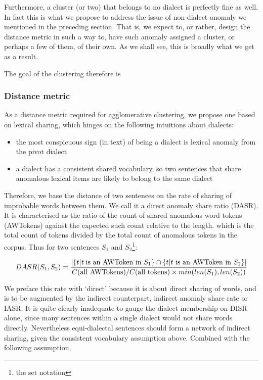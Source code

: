 \documentclass{article}
\begin{document}
Furthermore, a cluster (or two) that belongs to no dialect is perfectly fine as well. In fact this is what we propose to address the issue of non-dialect anomaly we mentioned in the preceding section. That is, we expect to, or rather, design the distance metric in such a way to, have such anomaly assigned a cluster, or perhaps a few of them, of their own. As we shall see, this is broadly what we get as a result. 

The goal of the clustering therefore is 

\subsubsection{Distance metric}

As a distance metric required for agglomerative clustering, we propose one based on lexical sharing, which hinges on the following intuitions about dialects:

\begin{itemize}
\item{the most conspicuous sign (in text) of being a dialect is lexical anomaly from the pivot dialect  }
\item{a dialect has a consistent shared vocabulary, so two sentences that share anomalous lexical items are likely to belong to the same dialect}
\end{itemize}

Therefore, we base the distance of two sentences on the rate of sharing of improbable words between them. We call it a direct anomaly share ratio (DASR). It is characterised as the ratio of the count of shared anomalous word tokens (AWTokens) against the expected such count relative to the length.  which is the total count of tokens divided by the total count of anomalous tokens in the corpus. Thus for two sentences $S_1$ and $S_2$\footnote{the set notation}:

\begin{equation}
  \label{eq:1}
DASR(S_1,S_2)= \frac{|\{t|\text{{\it t} is an AWToken in } S_1\}\cap{}\{t|t \text{ is an AWToken in } S_2\}|}{ C(\text{all AWTokens})/C(\text{all tokens})\times min(len(S_1),len(S_2))} 
\end{equation}
 
We preface this rate with `direct' because it is about direct sharing of words, and is to be augmented by the indirect counterpart, indirect anomaly share rate or IASR. It is quite clearly inadequate to gauge the dialect membership on DISR alone, since many sentences within a single dialect would not share words directly. Nevertheless equi-dialectal sentences should form a network of indirect sharing, given the consistent vocabulary assumption above. Combined with  the following assumption,
\end{document}
